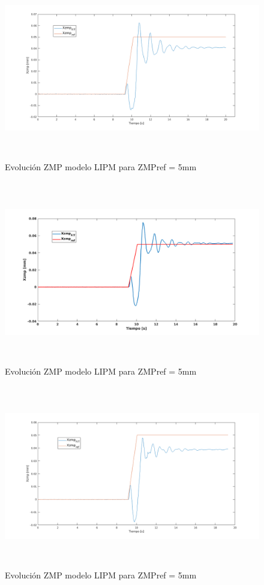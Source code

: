 \begin{figure}[H]
\centering
\includegraphics[width=13cm, height=8cm]{imagenes/apartado_5/5.1/55}
\caption{Evolución ZMP modelo LIPM para ZMPref = 5mm}
\label{figura55}
\end{figure}

\begin{figure}[H]
\centering
\includegraphics[width=13cm, height=8cm]{imagenes/apartado_5/5.1/56}
\caption{Evolución ZMP modelo LIPM para ZMPref = 5mm}
\label{figura56}
\end{figure}

\begin{figure}[H]
\centering
\includegraphics[width=13cm, height=8cm]{imagenes/apartado_5/5.1/57}
\caption{Evolución ZMP modelo LIPM para ZMPref = 5mm}
\label{figura57}
\end{figure}

